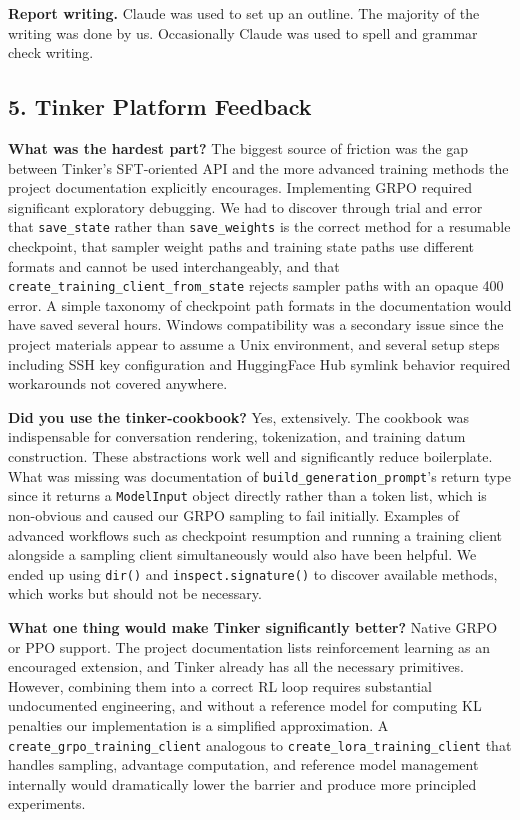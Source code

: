 \documentclass[10pt,letterpaper]{article}
\begin{document}
\textbf{Report writing.} Claude was used to set up an outline. The majority of the writing was done by us. Occasionally Claude was used to spell and grammar check writing. 
\subsection*{5. Tinker Platform Feedback}

\textbf{What was the hardest part?} The biggest source of friction was the gap between 
Tinker's SFT-oriented API and the more advanced training methods the project 
documentation explicitly encourages. Implementing GRPO required significant exploratory 
debugging. We had to discover through trial and error that \texttt{save\_state} rather 
than \texttt{save\_weights} is the correct method for a resumable checkpoint, that 
sampler weight paths and training state paths use different formats and cannot be used 
interchangeably, and that \texttt{create\_training\_client\_from\_state} rejects sampler 
paths with an opaque 400 error. A simple taxonomy of checkpoint path formats in the 
documentation would have saved several hours. Windows compatibility was a secondary 
issue since the project materials appear to assume a Unix environment, and several setup 
steps including SSH key configuration and HuggingFace Hub symlink behavior required 
workarounds not covered anywhere.

\textbf{Did you use the tinker-cookbook?} Yes, extensively. The cookbook was 
indispensable for conversation rendering, tokenization, and training datum construction. 
These abstractions work well and significantly reduce boilerplate. What was missing was 
documentation of \texttt{build\_generation\_prompt}'s return type since it returns a 
\texttt{ModelInput} object directly rather than a token list, which is non-obvious and 
caused our GRPO sampling to fail initially. Examples of advanced workflows such as 
checkpoint resumption and running a training client alongside a sampling client 
simultaneously would also have been helpful. We ended up using \texttt{dir()} and 
\texttt{inspect.signature()} to discover available methods, which works but should not 
be necessary.

\textbf{What one thing would make Tinker significantly better?} Native GRPO or PPO 
support. The project documentation lists reinforcement learning as an encouraged 
extension, and Tinker already has all the necessary primitives. However, combining them 
into a correct RL loop requires substantial undocumented engineering, and without a 
reference model for computing KL penalties our implementation is a simplified 
approximation. A \texttt{create\_grpo\_training\_client} analogous to 
\texttt{create\_lora\_training\_client} that handles sampling, advantage computation, 
and reference model management internally would dramatically lower the barrier and 
produce more principled experiments.
\end{document}
